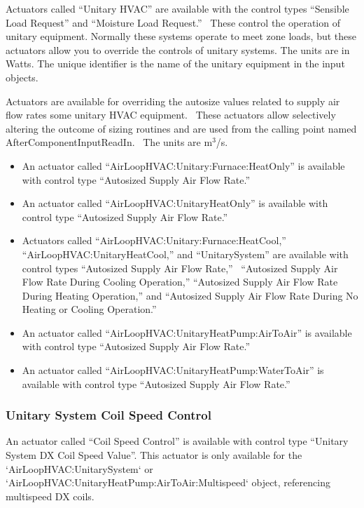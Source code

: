 Actuators called ``Unitary HVAC'' are available with the control types ``Sensible Load Request'' and ``Moisture Load Request.''~ These control the operation of unitary equipment. Normally these systems operate to meet zone loads, but these actuators allow you to override the controls of unitary systems. The units are in Watts. The unique identifier is the name of the unitary equipment in the input objects.

Actuators are available for overriding the autosize values related to supply air flow rates some unitary HVAC equipment.~ These actuators allow selectively altering the outcome of sizing routines and are used from the calling point named AfterComponentInputReadIn.~ The units are m\(^{3}\)/s.

\begin{itemize}
\item
  An actuator called ``AirLoopHVAC:Unitary:Furnace:HeatOnly'' is available with control type ``Autosized Supply Air Flow Rate.''
\item
  An actuator called ``AirLoopHVAC:UnitaryHeatOnly'' is available with control type ``Autosized Supply Air Flow Rate.''
\item
  Actuators called ``AirLoopHVAC:Unitary:Furnace:HeatCool,''  ``AirLoopHVAC:UnitaryHeatCool,'' and ``UnitarySystem'' are available with control types ``Autosized Supply Air Flow Rate,''~ ``Autosized Supply Air Flow Rate During Cooling Operation,'' ``Autosized Supply Air Flow Rate During Heating Operation,'' and ``Autosized Supply Air Flow Rate During No Heating or Cooling Operation.''
\item
  An actuator called ``AirLoopHVAC:UnitaryHeatPump:AirToAir'' is available with control type ``Autosized Supply Air Flow Rate.''
\item
  An actuator called ``AirLoopHVAC:UnitaryHeatPump:WaterToAir'' is available with control type ``Autosized Supply Air Flow Rate.''
\end{itemize}

\subsubsection{Unitary System Coil Speed Control}\label{unitary-system-coil-speed-ctrl}

An actuator called ``Coil Speed Control'' is available with control type ``Unitary System DX Coil Speed Value''. This actuator is only available for the `AirLoopHVAC:UnitarySystem` or `AirLoopHVAC:UnitaryHeatPump:AirToAir:Multispeed` object, referencing multispeed DX coils.

